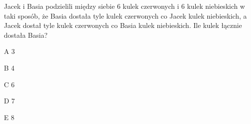 \begin{tresc}
Jacek i Basia podzielili między siebie 6 kulek czerwonych i 6 kulek niebieskich w taki sposób, że Basia dostała tyle kulek czerwonych co Jacek kulek niebieskich, a Jacek dostał tyle kulek czerwonych co Basia kulek niebieskich. Ile kulek łącznie dostała Basia?
\end{tresc}
\begin{wariant}{A} 3 \end{wariant}
\begin{wariant}{B} 4 \end{wariant}
\begin{wariant}{C} 6 \end{wariant}
\begin{wariant}{D} 7 \end{wariant}
\begin{wariant}{E} 8 \end{wariant}
